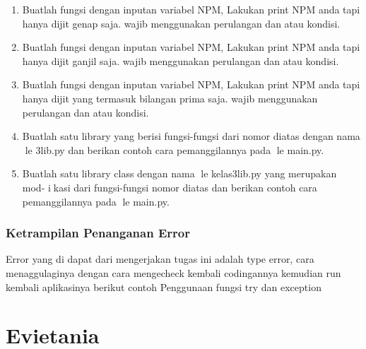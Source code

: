 \begin{enumerate}
    \item Buatlah fungsi dengan inputan variabel NPM, Lakukan print NPM anda tapi
    hanya dijit genap saja. wajib menggunakan perulangan dan atau kondisi.
    

    \item Buatlah fungsi dengan inputan variabel NPM, Lakukan print NPM anda tapi
    hanya dijit ganjil saja. wajib menggunakan perulangan dan atau kondisi.
    

    \item Buatlah fungsi dengan inputan variabel NPM, Lakukan print NPM anda tapi
    hanya dijit yang termasuk bilangan prima saja. wajib menggunakan perulangan
    dan atau kondisi.
    

    \item Buatlah satu library yang berisi fungsi-fungsi dari nomor diatas dengan nama
    le 3lib.py dan berikan contoh cara pemanggilannya pada le main.py.
    

    \item Buatlah satu library class dengan nama le kelas3lib.py yang merupakan mod-
    ikasi dari fungsi-fungsi nomor diatas dan berikan contoh cara pemanggilannya
    pada le main.py.
    
    
\end{enumerate}
\subsubsection{Ketrampilan Penanganan Error}
Error yang di dapat dari mengerjakan tugas ini adalah type error, cara menaggulaginya dengan cara mengecheck kembali codingannya
kemudian run kembali aplikasinya
berikut contoh Penggunaan fungsi try dan exception

\section{Evietania}
